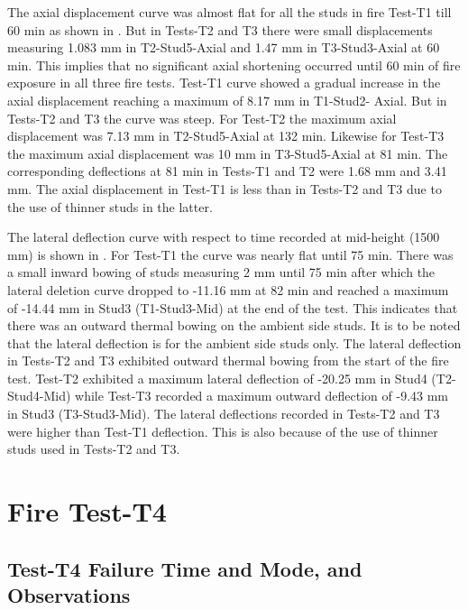 The axial displacement curve was almost flat for all the studs in fire Test-T1 till 60 min as shown in . But in Tests-T2 and T3 there were small displacements measuring 1.083 mm in T2-Stud5-Axial and 1.47 mm in T3-Stud3-Axial at 60 min. This implies that no significant axial shortening occurred until 60 min of fire exposure in all three fire tests. Test-T1 curve showed a gradual increase in the axial displacement reaching a maximum of 8.17 mm in T1-Stud2- Axial. But in Tests-T2 and T3 the curve was steep. For Test-T2 the maximum axial displacement was 7.13 mm in T2-Stud5-Axial at 132 min. Likewise for Test-T3 the maximum axial displacement was 10 mm in T3-Stud5-Axial at 81 min. The corresponding deflections at 81 min in Tests-T1 and T2 were 1.68 mm and 3.41 mm. The axial displacement in Test-T1 is less than in Tests-T2 and T3 due to the use of thinner studs in the latter.

The lateral deflection curve with respect to time recorded at mid-height (1500 mm) is shown in . For Test-T1 the curve was nearly flat until 75 min. There was a small inward bowing of studs measuring 2 mm until 75 min after which the lateral deletion curve dropped to -11.16 mm at 82 min and reached a maximum of -14.44 mm in Stud3 (T1-Stud3-Mid) at the end of the test. This indicates that there was an outward thermal bowing on the ambient side studs. It is to be noted that the lateral deflection is for the ambient side studs only. The lateral deflection in Tests-T2 and T3 exhibited outward thermal bowing from the start of the fire test. Test-T2 exhibited a maximum lateral deflection of -20.25 mm in Stud4 (T2-Stud4-Mid) while Test-T3 recorded a maximum outward deflection of -9.43 mm in Stud3 (T3-Stud3-Mid). The lateral deflections recorded in Tests-T2 and T3 were higher than Test-T1 deflection. This is also because of the use of thinner studs used in Tests-T2 and T3.

\section{Fire Test-T4}
\subsection{Test-T4 Failure Time and Mode, and Observations}


